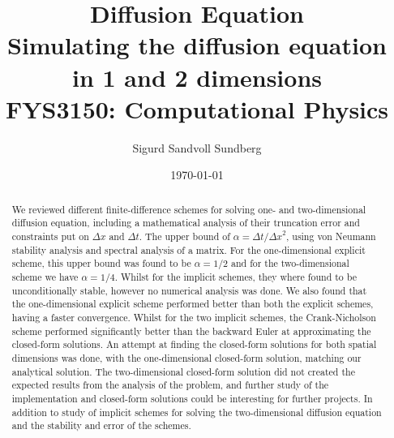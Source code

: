 \documentclass[%
reprint,
nofootinbib,
amsmath,amssymb,
aps,
]{revtex4-1}
\newcommand{\dt}{{\Delta t}}
\newcommand{\dx}{{\Delta x}}
\begin{document}
	
\title{Diffusion Equation \\
	\normalsize{Simulating the diffusion equation in 1 and 2 dimensions} \\
	\hrulefill\small{ FYS3150: Computational Physics }\hrulefill}

\author{Sigurd Sandvoll Sundberg}

%

\date{\today}

\begin{abstract} %
	We reviewed different finite-difference schemes for solving one- and two-dimensional diffusion equation, including a mathematical analysis of their truncation error and constraints put on $\dx$ and $\dt$. The upper bound of $\alpha = \dt/\dx^2$, using von Neumann stability analysis and spectral analysis of a matrix. For the one-dimensional explicit scheme, this upper bound was found to be $\alpha = 1/2$ and for the two-dimensional scheme we have $\alpha = 1/4$. Whilst for the implicit schemes, they where found to be unconditionally stable, however no numerical analysis was done. We also found that the one-dimensional explicit scheme performed better than both the explicit schemes, having a faster convergence. Whilst for the two implicit schemes, the Crank-Nicholson scheme performed significantly better than the backward Euler at approximating the closed-form solutions. An attempt at finding the closed-form solutions for both spatial dimensions was done, with the one-dimensional closed-form solution, matching our analytical solution. The two-dimensional closed-form solution did not created the expected results from the analysis of the problem, and further study of the implementation and closed-form solutions could be interesting for further projects. In addition to study of implicit schemes for solving the two-dimensional diffusion equation and the stability and error of the schemes.
	
\end{abstract}

\maketitle 
\end{document}
